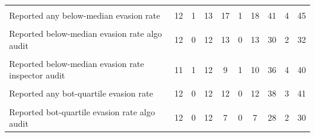 {\begin{tabular}{l*{9}{c}}
            &                     &                     &                     &                     &                     &                     &                     &                     &                     \\
Reported any below-median evasion rate&          12         &           1         &          13         &          17         &           1         &          18         &          41         &           4         &          45         \\
            &                     &                     &                     &                     &                     &                     &                     &                     &                     \\
Reported below-median evasion rate algo audit&          12         &           0         &          12         &          13         &           0         &          13         &          30         &           2         &          32         \\
            &                     &                     &                     &                     &                     &                     &                     &                     &                     \\
Reported below-median evasion rate  inspector audit&          11         &           1         &          12         &           9         &           1         &          10         &          36         &           4         &          40         \\
            &                     &                     &                     &                     &                     &                     &                     &                     &                     \\
Reported any bot-quartile evasion rate&          12         &           0         &          12         &          12         &           0         &          12         &          38         &           3         &          41         \\
            &                     &                     &                     &                     &                     &                     &                     &                     &                     \\
Reported bot-quartile  evasion rate algo audit&          12         &           0         &          12         &           7         &           0         &           7         &          28         &           2         &          30         \\

\end{tabular}}
